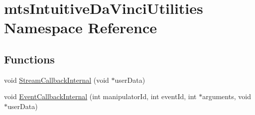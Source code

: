 \hypertarget{namespacemts_intuitive_da_vinci_utilities}{\section{mts\-Intuitive\-Da\-Vinci\-Utilities Namespace Reference}
\label{namespacemts_intuitive_da_vinci_utilities}
}
\subsection*{Functions}
\begin{DoxyCompactItemize}
\item 
void \hyperlink{namespacemts_intuitive_da_vinci_utilities_a216137233fb2f2741534cbdcb055c14b}{Stream\-Callback\-Internal} (void $\ast$user\-Data)
\item 
void \hyperlink{namespacemts_intuitive_da_vinci_utilities_aa645102f90c4df6d6b5573fb9aff71f5}{Event\-Callback\-Internal} (int manipulator\-Id, int event\-Id, int $\ast$arguments, void $\ast$user\-Data)
\end{DoxyCompactItemize}


